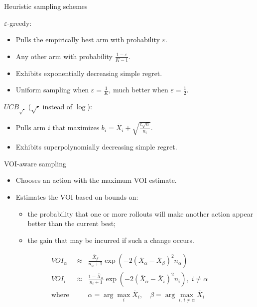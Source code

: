 \documentclass{beamer}
\begin{document}
\begin{frame}{Heuristic sampling schemes}

\onslide<+->
$\varepsilon$-greedy:
\begin{itemize} 
\item Pulls the empirically best arm with probability $\varepsilon$.
\item Any other arm with probability $\frac {1-\varepsilon} {K-1}$.
\item Exhibits exponentially decreasing simple regret.
\item Uniform sampling when $\varepsilon=\frac 1 K$, much better when
  $\varepsilon=\frac 1 2$.
\end{itemize}
\vspace{1em}
\onslide<+->
$UCB_{\sqrt{\cdot}}$ ($\sqrt{\cdot}$ instead of $\log$): 
\begin{itemize}
\item Pulls arm $i$ that maximizes
  $b_i=\overline X_i+\sqrt {\frac {c \sqrt n} {n_i}}$. 
\item Exhibits superpolynomially decreasing simple regret.
\end{itemize}
\end{frame}

\begin{frame}{VOI-aware sampling}

\begin{itemize}
\item Chooses an action with the maximum VOI estimate.
\item Estimates the VOI based on bounds on:
  \begin{itemize}
  \item the probability that one or more rollouts will make another
    action appear better than the current best;
  \item the gain that may be incurred if such a change occurs.
  \end{itemize}
\end{itemize}
\begin{eqnarray*}
VOI_\alpha&\approx&\frac {\overline X_\beta} {n_\alpha+1}
\exp\left(-2(\overline X_\alpha - \overline X_\beta)^2 n_\alpha\right)\\
VOI_i&\approx&\frac {1-\overline X_\alpha} {n_i+1}
\exp\left(-2(\overline X_\alpha - \overline X_i)^2 n_i\right),\; i\ne\alpha\nonumber\\
\mbox{where }&&\alpha=\arg\max_i \overline X_i,\quad
             \beta=\arg\max_{i,\,i\ne\alpha} \overline X_i\nonumber
\end{eqnarray*}
\end{frame}
\end{document}
